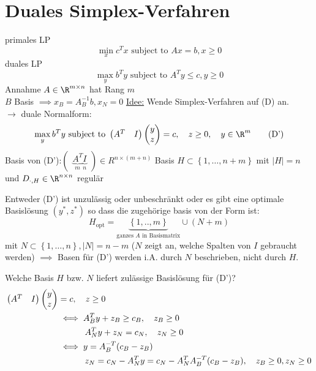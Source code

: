 \section{Duales Simplex-Verfahren}
primales LP 
\begin{equation*}\label{primalLP}
	\min_{x}c^{T} x \text{ subject to }Ax = b, x \geq 0 \tag{P} 
\end{equation*}
duales LP 
\begin{equation*}\label{dualLP}
	\max_{y}b^{T} y \text{ subject to }A^{T} y \leq c, y \geq 0 \tag{D} 
\end{equation*}
Annahme $A \in \R^{m \times n}$ hat Rang $m$ \\
$B$ Basis $\implies x_{B}= A^{-1}_{B}b, x_{N}=0$\nl
\underline{Idee:} Wende Simplex-Verfahren auf (D) an.\\
$\to$ duale Normalform: 
\begin{equation*}\label{dualnf}
	\max_{y} b^{T} y \text{ subject to }
	\begin{pmatrix}
		A^{T} & I
	\end{pmatrix}
	\begin{pmatrix}
	y\\z	
	\end{pmatrix}
	= c, \quad z \geq 0, \quad y \in \R^m \tag{D'}
\end{equation*}
Basis von (D'):$  
\begin{pmatrix}
	\underbrace{A^{T}}_{m} \underbrace{I}_{n}
\end{pmatrix}
\in R^{n \times(m +n)}$
Basis $H \subset \left\{1,\dots ,n+m \right\}$ mit $|H|=n$ und $D_{\cdot,H}\in \R^{n \times n}$ regulär 
\begin{theorem}
	Entweder (D') ist unzulässig oder unbeschränkt oder es gibt eine optimale Basislösung $(y^*,z^*)$ so dass die zugehörige basis von der Form ist:
	\begin{equation*}
		H_{\text{opt}}=\underbrace{ \left\{1,..,m \right\}}_{\text{ganzes $A$ in Basismatrix}}\cup (N+m)
	\end{equation*}
	mit $N \subset \left\{1,\dots ,n \right\}, |N|= n-m$ ($N$ zeigt an, welche Spalten von $I$ gebraucht werden)
	$\implies$ Basen für (D') werden i.A. durch $N$ beschrieben, nicht durch $H$.
\end{theorem}
Welche Basis $H$ bzw. $N$ liefert zulässige Basislösung für (D')?
\begin{align*}
	\begin{pmatrix}
		A^{T}  & I
	\end{pmatrix}
	\begin{pmatrix}
	y\\z	
	\end{pmatrix}
	&=c, \quad z \geq 0\\
	&{}\iff A_{B}^{T} y + z_{B} \geq c_{B}, \quad z_{B} \geq 0\\
	&{}\hspace{1.1cm} A_{N}^{T} y + z_{N} = c_{N}, \quad z_{N} \geq 0 \\
	&{}\iff y = A_{B}^{-T}(c_{B}-z_{B})\\
	&{}\hspace{1.1cm} z_{N}= c_{N} - A_{N}^{T}y = c_{N}-A_{N}^{T} A_{B}^{-T}(c_{B}-z_{B}) ,\quad z_{B}\geq 0 ,z_{N} \geq 0
\end{align*}
